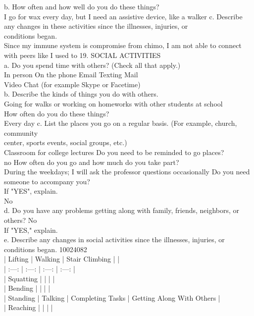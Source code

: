\documentclass[12pt]{article}
\begin{document}
b. How often and how well do you do these things?\\
I go for wax every day, but I need an assistive device, like a walker
c. Describe any changes in these activities since the illnesses, injuries, or \\conditions began.\\
Since my immune system is compromise from chimo, I am not able to connect with peers like I used to
19. SOCIAL ACTIVITIES\\
a. Do you spend time with others? (Check all that apply.)\\
In person On the phone Email Texting Mail\\
Video Chat (for example Skype or Facetime) \\
b. Describe the kinds of things you do with others.\\
Going for walks or working on homeworks with other students at school
\\
How often do you do these things?\\
Every day
c. List the places you go on a regular basis. (For example, church, community \\center, sports events, social groups, etc.)
\\
Classroom for college lectures
Do you need to be reminded to go places?\\
no
How often do you go and how much do you take part?\\
During the weekdays; I will ask the professor questions occasionally
Do you need someone to accompany you?\\
If "YES", explain.\\
No\\
d. Do you have any problems getting along with family, friends, neighbors, or \\others?
No\\
If "YES," explain.\\
e. Describe any changes in social activities since the illnesses, injuries, or\\ conditions began.
10024082\\
| Lifting | Walking | Stair Climbing | |\\
| :---: | :---: | :---: | :---: |\\
| Squatting | | | |\\
| Bending | | | |\\
| Standing | Talking | Completing Tasks | Getting Along With Others |\\
| Reaching | | |  |\\
\end{document}
